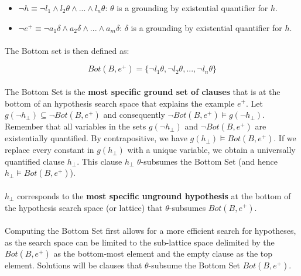 \documentclass{article}
\theoremstyle{plain}
\theoremstyle{definition}
\begin{document}
\begin{multicols}{2}
\begin{itemize}
\item $\lnot h \equiv \lnot l_1 \land l_2\theta \land ... \land l_n\theta$: $\theta$ is a grounding by existential quantifier for $h$.
\item $\lnot e^+ \equiv \lnot a_1\delta \land a_2\delta \land ... \land a_m\delta$: $\delta$ is a grounding by existential quantifier for $h$.
\end{itemize}

\paragraph{} The Bottom set is then defined as:

$$Bot(B, e^+) = \{\lnot l_1\theta, \lnot l_2\theta, ..., \lnot l_n\theta\}$$

\paragraph{} The Bottom Set is the \textbf{most specific ground set of clauses} that is at the bottom of an hypothesis search space that explains the example $e^+$. Let $g(\lnot h_{\perp}) \subseteq \lnot Bot(B, e^+)$ and consequently $\lnot Bot(B, e^+) \models g(\lnot h_{\perp})$. Remember that all variables in the sets $g(\lnot h_{\perp})$ and $\lnot Bot(B, e^+)$ are existentially quantified. By contrapositive, we have $g(h_{\perp}) \models Bot(B, e^+)$. If we replace every constant in $g(h_{\perp})$ with a unique variable, we obtain a universally quantified clause $h_{\perp}$. This clause $h_{\perp}$ $\theta$-subsumes the Bottom Set (and hence $h_{\perp} \models Bot(B, e^+)$).

\paragraph{} $h_{\perp}$ corresponds to the \textbf{most specific unground hypothesis} at the bottom of the hypothesis search space (or lattice) that $\theta$-subsumes $Bot(B, e^+)$. 

\paragraph{} Computing the Bottom Set first allows for a more efficient search for hypotheses, as the search space can be limited to the sub-lattice space delimited by the $Bot(B, e^+)$ as the bottom-most element and the empty clause as the top element. Solutions will be clauses that $\theta$-subsume the Bottom Set $Bot(B, e^+)$.


\end{multicols}
\end{document}
